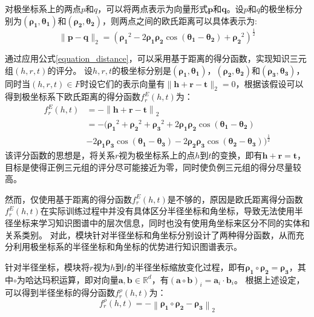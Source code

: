 \documentclass[algorithmlist, AutoFakeBold, AutoFakeSlant, figurelist, tablelist, nomlist, engineering]{seuthesix}
\begin{document}
对极坐标系上的两点$p$和$q$，可以将两点表示为向量形式$\bm{p}$和$\bm{q}$。设$p$和$q$的极坐标分别为$(\bm{\rho_1}, \bm{\theta_1})$和$(\bm{\rho_2}, \bm{\theta_2})$，则两点之间的欧氏距离可以具体表示为:
\begin{equation}
  \|\bm{p}-\bm{q}\|_2=\left(\bm{\rho_1}^2-2 \bm{\rho_1} \bm{\rho_2} \cos \left(\bm{\theta_1}-\bm{\theta_2}\right)+\bm{\rho_2}^2\right)^{\frac{1}{2}}
  \label{equation_distance}
\end{equation}

通过应用公式\ref{equation_distance}，可以采用基于距离的得分函数，实现知识三元组$(h, r, t)$的评分。
设$h, r, t$的极坐标分别是$\left(\bm{\rho_1}, \bm{\theta_1}\right)$，$\left(\bm{\rho_2}, \bm{\theta_2}\right)$和$\left(\bm{\rho_3}, \bm{\theta_3}\right)$，同时当$(h, r, t) \in F$时设它们的表示向量有$\|\bm{h} + \bm{r} - \bm{t}\|_2 = 0$，根据该假设可以得到极坐标系下欧氏距离的得分函数$f^E_r(h, t)$为：
\begin{equation}
  \begin{aligned}
    f^{E}_{r}\left(h, t\right) & =-\left\|\bm{h}+\bm{r}-\bm{t}\right\|_2 \\
    & =-(\bm{\rho_1}^2+\bm{\rho_2}^2+\bm{\rho_3}^2 + 2 \bm{\rho_1} \bm{\rho_2} \cos \left(\bm{\theta_1}-\bm{\theta_2}\right) \\
    & - 2 \bm{\rho_1} \bm{\rho_3} \cos \left(\bm{\theta_1}-\bm{\theta_3}\right) - 2 \bm{\rho_2} \bm{\rho_3} \cos \left(\bm{\theta_2}-\bm{\theta_3}\right))^{\frac{1}{2}}
  \end{aligned}
\end{equation}
该评分函数的思想是，将关系$r$视为极坐标系上的点$h$到$t$的变换，即有$\bm{h} + \bm{r} = \bm{t}$，目标是使得正例三元组的评分尽可能接近为零，同时使负例三元组的得分尽量较高。

然而，仅使用基于距离的得分函数$f^E_r(h, t)$是不够的，原因是欧氏距离得分函数$f^E_r(h, t)$在实际训练过程中并没有具体区分半径坐标和角坐标，导致无法使用半径坐标来学习知识图谱中的层次信息，同时也没有使用角坐标来区分不同的实体和关系类别。
对此，模块针对半径坐标和角坐标分别设计了两种得分函数，从而充分利用极坐标系的半径坐标和角坐标的优势进行知识图谱表示。

针对半径坐标，模块将$r$视为$h$到$t$的半径坐标缩放变化过程，即有$\bm{\rho_1} \circ \bm{\rho_2} = \bm{\rho_3}$，其中$\circ$为哈达玛积运算，即对向量$\bm{a}, \bm{b} \in \mathbb{R}^{d}$，有$\left(\mathbf{a} \circ \mathbf{b}\right)_i = \mathbf{a}_i \cdot \mathbf{b}_i$。
根据上述设定，可以得到半径坐标的得分函数$f^{\rho}_r(h, t)$为：
\begin{equation}
  f^{\rho}_r\left(h, t\right) =-\left\|\bm{\rho_1} \circ \bm{\rho_2} - \bm{\rho_3}\right\|_2
\end{equation}
\end{document}
